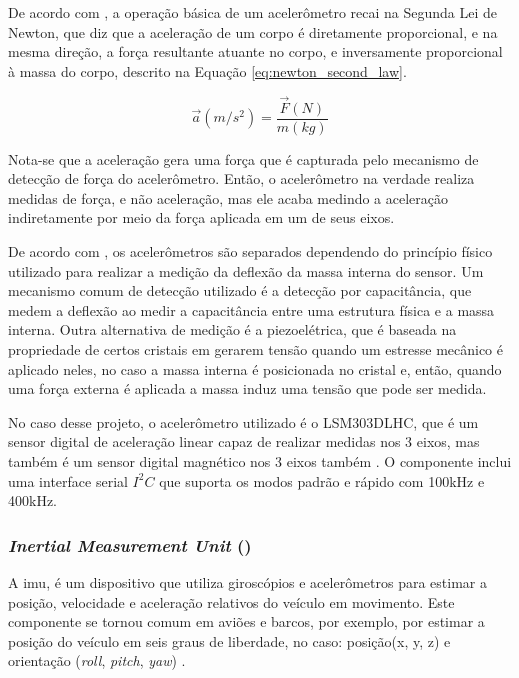 \documentclass[acronym, symbols, table]{fei}
\begin{document}
				De acordo com \textcite{dadafshar2014accelerometer}, a operação básica de um acelerômetro recai na Segunda Lei de Newton, que diz que a aceleração de um corpo é diretamente proporcional, e na mesma direção, a força resultante atuante no corpo, e inversamente proporcional à massa do corpo, descrito na Equação \ref{eq:newton_second_law}.
				
				\begin{equation}\label{eq:newton_second_law}
					\overrightarrow{a}(m/s^2) = \frac{\overrightarrow{F}(N)}{m(kg)}
				\end{equation}
			
				Nota-se que a aceleração gera uma força que é capturada pelo mecanismo de detecção de força do acelerômetro. Então, o acelerômetro na verdade realiza medidas de força, e não aceleração, mas ele acaba medindo a aceleração indiretamente por meio da força aplicada em um de seus eixos.
				
				De acordo com \textcite{siegwart2011introduction}, os acelerômetros são separados dependendo do princípio físico utilizado para realizar a medição da deflexão da massa interna do sensor. Um mecanismo comum de detecção utilizado é a detecção por capacitância, que medem a deflexão ao medir a capacitância entre uma estrutura física e a massa interna. Outra alternativa de medição é a piezoelétrica, que é baseada na propriedade de certos cristais em gerarem tensão quando um estresse mecânico é aplicado neles, no caso a massa interna é posicionada no cristal e, então, quando uma força externa é aplicada a massa induz uma tensão que pode ser medida.
				
				No caso desse projeto, o acelerômetro utilizado é o LSM303DLHC, que é um sensor digital de aceleração linear capaz de realizar medidas nos 3 eixos, mas também é um sensor digital magnético nos 3 eixos também \cite{datasheet_accel}. O componente inclui uma interface serial $I^2C$ que suporta os modos padrão e rápido com 100kHz e 400kHz.
				
			\subsubsection{\textit{Inertial Measurement Unit} ()}
			
				A \acrshort{imu}, é um dispositivo que utiliza giroscópios e acelerômetros para estimar a posição, velocidade e aceleração relativos do veículo em movimento. Este componente se tornou comum em aviões e barcos, por exemplo, por estimar a posição do veículo em seis graus de liberdade, no caso: posição(x, y, z) e orientação (\textit{roll}, \textit{pitch}, \textit{yaw}) \cite{siegwart2011introduction}.
				
\end{document}
